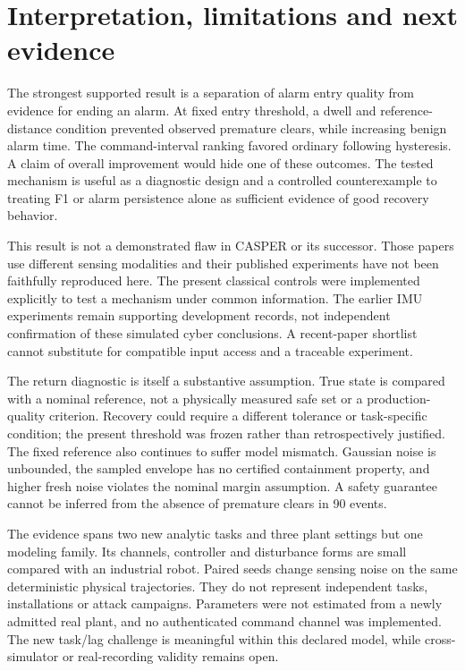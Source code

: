 \section{Interpretation, limitations and next evidence}
The strongest supported result is a separation of alarm entry quality from evidence for ending an alarm. At fixed entry threshold, a dwell and reference-distance condition prevented observed premature clears, while increasing benign alarm time. The command-interval ranking favored ordinary following hysteresis. A claim of overall improvement would hide one of these outcomes. The tested mechanism is useful as a diagnostic design and a controlled counterexample to treating F1 or alarm persistence alone as sufficient evidence of good recovery behavior.

This result is not a demonstrated flaw in CASPER or its successor. Those papers use different sensing modalities and their published experiments have not been faithfully reproduced here. The present classical controls were implemented explicitly to test a mechanism under common information. The earlier IMU experiments remain supporting development records, not independent confirmation of these simulated cyber conclusions. A recent-paper shortlist cannot substitute for compatible input access and a traceable experiment.

The return diagnostic is itself a substantive assumption. True state is compared with a nominal reference, not a physically measured safe set or a production-quality criterion. Recovery could require a different tolerance or task-specific condition; the present threshold was frozen rather than retrospectively justified. The fixed reference also continues to suffer model mismatch. Gaussian noise is unbounded, the sampled envelope has no certified containment property, and higher fresh noise violates the nominal margin assumption. A safety guarantee cannot be inferred from the absence of premature clears in 90 events.

The evidence spans two new analytic tasks and three plant settings but one modeling family. Its channels, controller and disturbance forms are small compared with an industrial robot. Paired seeds change sensing noise on the same deterministic physical trajectories. They do not represent independent tasks, installations or attack campaigns. Parameters were not estimated from a newly admitted real plant, and no authenticated command channel was implemented. The new task/lag challenge is meaningful within this declared model, while cross-simulator or real-recording validity remains open.

